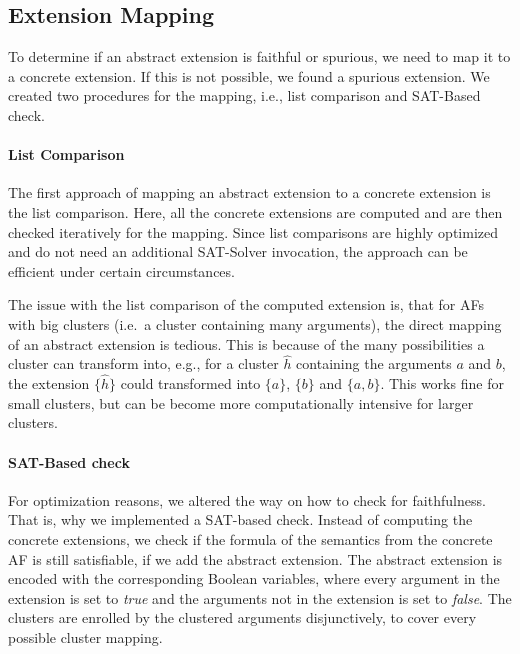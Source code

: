 \subsection{Extension Mapping}
\label{subsec:ExtensionMapping}
To determine if an abstract extension is faithful or spurious, we need to map it to a concrete extension. If this is not possible, we found a spurious extension. We created two procedures for the mapping, i.e., list comparison and SAT-Based check.

\paragraph{List Comparison}
The first approach of mapping an abstract extension to a concrete extension is the list comparison. Here, all the concrete extensions are computed and are then checked iteratively for the mapping. Since list comparisons are highly optimized and do not need an additional SAT-Solver invocation, the approach can be efficient under certain circumstances.

The issue with the list comparison of the computed extension is, that for AFs with big clusters (i.e.\ a cluster containing many arguments), the direct mapping of an abstract extension is tedious. This is because of the many possibilities a cluster can transform into, e.g., for a cluster $\hat{h}$ containing the arguments $a$ and $b$, the extension $\{\hat{h}\}$ could transformed into $\{a\}$, $\{b\}$ and $\{a, b\}$. This works fine for small clusters, but can be become more computationally intensive for larger clusters.


\paragraph{SAT-Based check}
For optimization reasons, we altered the way on how to check for faithfulness. That is, why we implemented a SAT-based check. Instead of computing the concrete extensions, we check if the formula of the semantics from the concrete AF is still satisfiable, if we add the abstract extension. The abstract extension is encoded with the corresponding Boolean variables, where every argument in the extension is set to \emph{true} and the arguments not in the extension is set to \emph{false}. The clusters are enrolled by the clustered arguments disjunctively, to cover every possible cluster mapping.






